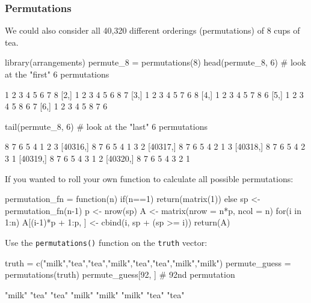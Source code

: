 \documentclass[a4paper]{article}\usepackage[]{graphicx}\usepackage[]{xcolor}
\begin{document}
\subsubsection{Permutations}
We could also consider all 40,320 different orderings (permutations) of 8 cups of tea.
\begin{Schunk}
\begin{Sinput}
library(arrangements)
permute_8 = permutations(8)
head(permute_8, 6) # look at the "first" 6 permutations
\end{Sinput}
\begin{Soutput}
     [,1] [,2] [,3] [,4] [,5] [,6] [,7] [,8]
[1,]    1    2    3    4    5    6    7    8
[2,]    1    2    3    4    5    6    8    7
[3,]    1    2    3    4    5    7    6    8
[4,]    1    2    3    4    5    7    8    6
[5,]    1    2    3    4    5    8    6    7
[6,]    1    2    3    4    5    8    7    6
\end{Soutput}
\begin{Sinput}
tail(permute_8, 6) # look at the "last" 6 permutations
\end{Sinput}
\begin{Soutput}
         [,1] [,2] [,3] [,4] [,5] [,6] [,7] [,8]
[40315,]    8    7    6    5    4    1    2    3
[40316,]    8    7    6    5    4    1    3    2
[40317,]    8    7    6    5    4    2    1    3
[40318,]    8    7    6    5    4    2    3    1
[40319,]    8    7    6    5    4    3    1    2
[40320,]    8    7    6    5    4    3    2    1
\end{Soutput}
\end{Schunk}
If you wanted to roll your own function to calculate all possible permutations:
\begin{Schunk}
\begin{Sinput}
permutation_fn = function(n){
  if(n==1){
    return(matrix(1))
  } else {
    sp <- permutation_fn(n-1)
    p <- nrow(sp)
    A <- matrix(nrow = n*p, ncol = n)
    for(i in 1:n){
      A[(i-1)*p + 1:p, ] <- cbind(i, sp + (sp >= i))
    }
    return(A)
  }
}
\end{Sinput}
\end{Schunk}
Use the \lstinline|permutations()| function on the \lstinline|truth| vector:
\begin{Schunk}
\begin{Sinput}
truth = c("milk","tea","tea","milk","tea","tea","milk","milk")
permute_guess = permutations(truth)
permute_guess[92, ] # 92nd permutation
\end{Sinput}
\begin{Soutput}
[1] "milk" "tea"  "tea"  "milk" "milk" "milk" "tea"  "tea" 
\end{Soutput}
\end{Schunk}
\end{document}
